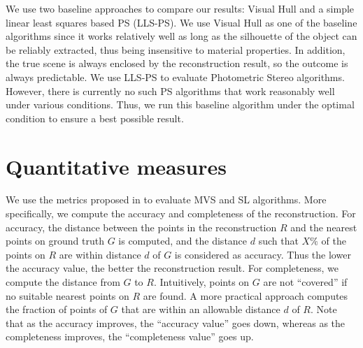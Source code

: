 We use two baseline approaches to compare our results: Visual Hull and a simple linear least squares based PS (LLS-PS). We use Visual Hull as one of the baseline algorithms since it works relatively well as long as the silhouette of the object can be reliably extracted, thus being insensitive to material properties. In addition, the true scene is always enclosed by the reconstruction result, so the outcome is always predictable. We use LLS-PS to evaluate Photometric Stereo algorithms. However, there is currently no such PS algorithms that work reasonably well under various conditions. Thus, we run this baseline algorithm under the optimal condition to ensure a best possible result.

\section{Quantitative measures}
We use the metrics proposed in \cite{seitz2006comparison} to evaluate MVS and SL algorithms. More specifically, we compute the accuracy and completeness of the reconstruction. For accuracy, the distance between the points in the reconstruction $R$ and the nearest points on ground truth $G$ is computed, and the distance $d$ such that $X\%$ of the points on $R$ are within distance $d$ of $G$ is considered as accuracy. Thus the lower the accuracy value, the better the reconstruction result. For completeness, we compute the distance from $G$ to $R$. Intuitively, points on $G$ are not ``covered'' if no suitable nearest points on $R$ are found. A more practical approach computes the fraction of points of $G$ that are within an allowable distance $d$ of $R$.
Note that as the accuracy improves, the ``accuracy value'' goes down, whereas as the completeness improves, the ``completeness value'' goes up.


